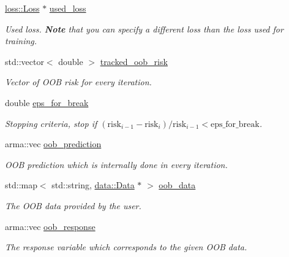 \begin{DoxyCompactItemize}
\item 
\mbox{\hyperlink{classloss_1_1_loss}{loss\+::\+Loss}} $\ast$ \mbox{\hyperlink{classlogger_1_1_oob_risk_logger_a40d02b9eec15e823bb2d71cf2112d6ed}{used\+\_\+loss}}
\begin{DoxyCompactList}\small\item\em Used loss. {\bfseries Note} that you can specify a different loss than the loss used for training. \end{DoxyCompactList}\item 
std\+::vector$<$ double $>$ \mbox{\hyperlink{classlogger_1_1_oob_risk_logger_a00a9435107588888c891c88aead67159}{tracked\+\_\+oob\+\_\+risk}}
\begin{DoxyCompactList}\small\item\em Vector of O\+OB risk for every iteration. \end{DoxyCompactList}\item 
double \mbox{\hyperlink{classlogger_1_1_oob_risk_logger_a6dccaf686895c4a3f9eb88a8f74e65fa}{eps\+\_\+for\+\_\+break}}
\begin{DoxyCompactList}\small\item\em Stopping criteria, stop if $(\mathrm{risk}_{i-1} - \mathrm{risk}_i) / \mathrm{risk}_{i-1} < \mathrm{eps\_for\_break}$. \end{DoxyCompactList}\item 
arma\+::vec \mbox{\hyperlink{classlogger_1_1_oob_risk_logger_a4fcb9d558fd61e6d8e54dbfd955272ee}{oob\+\_\+prediction}}
\begin{DoxyCompactList}\small\item\em O\+OB prediction which is internally done in every iteration. \end{DoxyCompactList}\item 
std\+::map$<$ std\+::string, \mbox{\hyperlink{classdata_1_1_data}{data\+::\+Data}} $\ast$ $>$ \mbox{\hyperlink{classlogger_1_1_oob_risk_logger_ac8effe8d73f093391873e3afbfb85323}{oob\+\_\+data}}
\begin{DoxyCompactList}\small\item\em The O\+OB data provided by the user. \end{DoxyCompactList}\item 
arma\+::vec \mbox{\hyperlink{classlogger_1_1_oob_risk_logger_a597783cacae66397b3c172c0c6fabcd3}{oob\+\_\+response}}
\begin{DoxyCompactList}\small\item\em The response variable which corresponds to the given O\+OB data. \end{DoxyCompactList}\end{DoxyCompactItemize}
